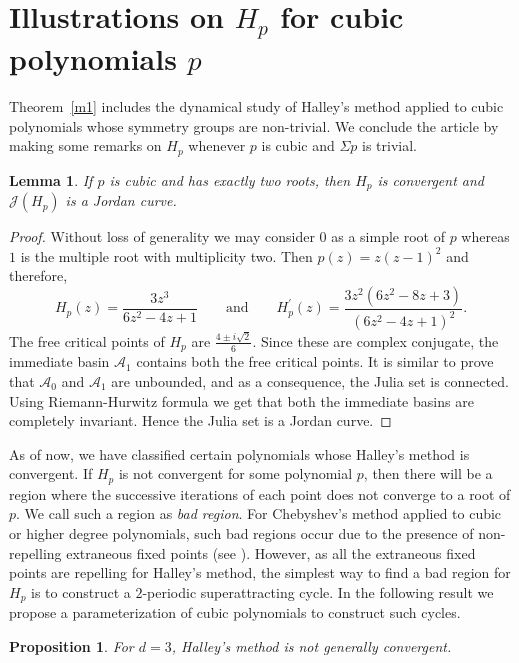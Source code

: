 \documentclass[12pt]{article}
\newtheorem{lem}{Lemma}[section]
\newtheorem{prop}{Proposition}[section]
\begin{document}
\section{Illustrations on $H_p$ for cubic polynomials $p$}\label{Sect-5}
Theorem~\ref{m1} includes the dynamical study of Halley's method applied to cubic polynomials whose symmetry groups are non-trivial. We conclude the article by making some remarks on $H_p$ whenever $p$ is cubic and $\Sigma p$ is trivial.
\begin{lem}
If $p$ is cubic and has exactly two roots, then $H_{p}$ is convergent and $ \mathcal{J}(H_p) $ is a Jordan curve.
\end{lem}
\begin{proof}
Without loss of generality we may consider $0$ as a simple root of $p$ whereas $1$ is the multiple root with multiplicity two. Then $p(z)=z(z-1)^{2}$ and therefore,
$$
H_{p}(z)=\frac{3 z^{3}}{6 z^{2}-4 z+1} \qquad\text {and}\qquad H_{p}^{\prime}(z)=\frac{3 z^{2}\left(6 z^{2}-8 z+3\right)}{\left(6 z^{2}-4 z+1\right)^{2}}.
$$
The free critical points of $ H_p $ are $\frac{4 \pm i \sqrt{2}}{6}$. Since these are complex conjugate, the immediate basin $\mathcal{A}_{1}$ contains both the free critical points. It is similar to prove that $\mathcal{A}_0$ and $\mathcal{A}_{1}$ are unbounded, and as a consequence, the Julia set is connected. Using Riemann-Hurwitz formula we get that both the immediate basins are completely invariant. Hence the Julia set is a Jordan curve.
\end{proof}
As of now, we have classified certain polynomials whose Halley's method is convergent. If $H_p$ is not convergent for some polynomial $p$, then there will be a region where the successive iterations of each point does not converge to a root of $p$. We call such a region as \textit{bad region}. For Chebyshev's method applied to cubic or higher degree polynomials, such bad regions occur due to the presence of non-repelling extraneous fixed points (see \cite[Theorem 1.2]{Nayak-Pal2022}). However, as all the extraneous fixed points are repelling for Halley's method, the simplest way to find a bad region for $H_p$ is to construct a $2$-periodic superattracting cycle. In the following result we propose a parameterization of cubic polynomials to construct such cycles.
\begin{prop}\label{exst_2p}
	For $d=3$, Halley's method is not generally convergent.
\end{prop}
\end{document}
